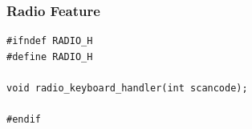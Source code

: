 \documentclass[../main.tex]{subfiles}
\begin{document}
\subsubsection{Radio Feature}
\label{apx:radio_feature}


\begin{listing}[H]
    \begin{verbatim}
#ifndef RADIO_H
#define RADIO_H

void radio_keyboard_handler(int scancode);

#endif
    \end{verbatim}
    \caption{Implementation of \texttt{radio.h}}
    \label{lst:radio_h}
\end{listing}
\end{document}
